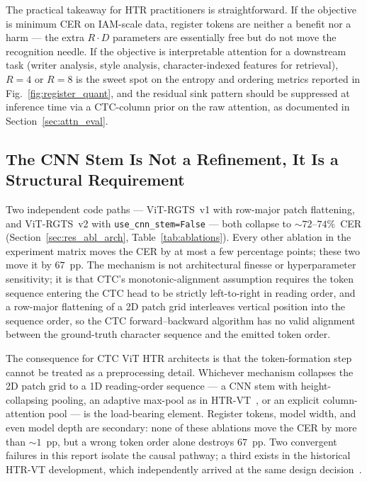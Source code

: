 The practical takeaway for HTR practitioners is straightforward. If the objective is minimum CER on IAM-scale data, register tokens are neither a benefit nor a harm --- the extra $R \cdot D$ parameters are essentially free but do not move the recognition needle. If the objective is interpretable attention for a downstream task (writer analysis, style analysis, character-indexed features for retrieval), $R = 4$ or $R = 8$ is the sweet spot on the entropy and ordering metrics reported in Fig.~\ref{fig:register_quant}, and the residual sink pattern should be suppressed at inference time via a CTC-column prior on the raw attention, as documented in Section~\ref{sec:attn_eval}.

\subsection{The CNN Stem Is Not a Refinement, It Is a Structural Requirement}
\label{sec:disc_cnnstem}

Two independent code paths --- ViT-RGTS~v1 with row-major patch flattening, and ViT-RGTS~v2 with \texttt{use\_cnn\_stem=False} --- both collapse to ${\sim}72$--$74\%$~CER (Section~\ref{sec:res_abl_arch}, Table~\ref{tab:ablations}). Every other ablation in the experiment matrix moves the CER by at most a few percentage points; these two move it by $67$~pp. The mechanism is not architectural finesse or hyperparameter sensitivity; it is that CTC's monotonic-alignment assumption requires the token sequence entering the CTC head to be strictly left-to-right in reading order, and a row-major flattening of a 2D patch grid interleaves vertical position into the sequence order, so the CTC forward--backward algorithm has no valid alignment between the ground-truth character sequence and the emitted token order.

The consequence for CTC ViT HTR architects is that the token-formation step cannot be treated as a preprocessing detail. Whichever mechanism collapses the 2D patch grid to a 1D reading-order sequence --- a CNN stem with height-collapsing pooling, an adaptive max-pool as in HTR-VT~\cite{li2024htrvt}, or an explicit column-attention pool --- is the load-bearing element. Register tokens, model width, and even model depth are secondary: none of these ablations move the CER by more than ${\sim}1$~pp, but a wrong token order alone destroys $67$~pp. Two convergent failures in this report isolate the causal pathway; a third exists in the historical HTR-VT development, which independently arrived at the same design decision~\cite{li2024htrvt}.

